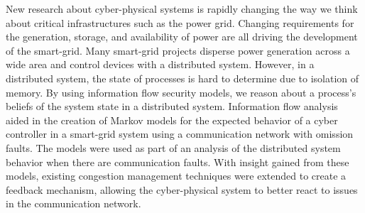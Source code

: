 New research about cyber-physical systems is rapidly changing the way we think about critical infrastructures such as the power grid.
Changing requirements for the generation, storage, and availability of power are all driving the development of the smart-grid.
Many smart-grid projects disperse power generation across a wide area and control devices with a distributed system. 
However, in a distributed system, the state of processes is hard to determine due to isolation of memory.
By using information flow security models, we reason about a process's beliefs of the system state in a distributed system.
Information flow analysis aided in the creation of Markov models for the expected behavior of a cyber controller in a smart-grid system using a communication network with omission faults.
The models were used as part of an analysis of the distributed system behavior when there are communication faults.
With insight gained from these models, existing congestion management techniques were extended to create a feedback mechanism, allowing the cyber-physical system to better react to issues in the communication network.
